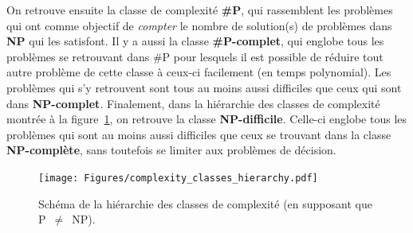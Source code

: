 On retrouve ensuite la classe de complexité \textbf{\#P}, qui rassemblent les problèmes qui ont comme objectif de \emph{compter} le nombre de solution(s) de problèmes dans \textbf{NP} qui les satisfont.
Il y a aussi la classe \textbf{\#P-complet}, qui englobe tous les problèmes se retrouvant dans \#P pour lesquels il est possible de réduire tout autre problème de cette classe à ceux-ci facilement (en temps polynomial).
Les problèmes qui s'y retrouvent sont tous au moins aussi difficiles que ceux qui sont dans \textbf{NP-complet}.
Finalement, dans la hiérarchie des classes de complexité montrée à la figure~\ref{fig:complexites}, on retrouve la classe \textbf{NP-difficile}. 
Celle-ci englobe tous les problèmes qui sont au moins aussi difficiles que ceux se trouvant dans la classe \textbf{NP-complète}, sans toutefois se limiter aux problèmes de décision.
\begin{figure}[h]
    \centering
    \texttt{[image: Figures/complexity\_classes\_hierarchy.pdf]}
    \caption{Schéma de la hiérarchie des classes de complexité (en supposant que P~$\ne$~NP).}
    \label{fig:complexites}
\end{figure}



